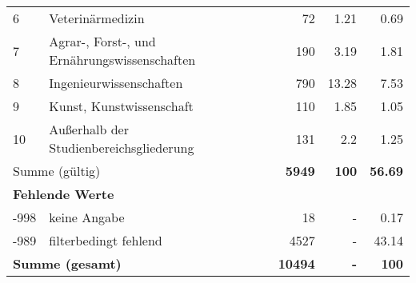 \begin{longtable}{lXrrr}
     6 &
     \multicolumn{1}{X}{ Veterinärmedizin   } &


       \num{72} &
       \num[round-mode=places,round-precision=2]{1,21} &
         \num[round-mode=places,round-precision=2]{0,69} \\

     7 &
     \multicolumn{1}{X}{ Agrar-, Forst-, und Ernährungswissenschaften   } &


       \num{190} &
       \num[round-mode=places,round-precision=2]{3,19} &
         \num[round-mode=places,round-precision=2]{1,81} \\

     8 &
     \multicolumn{1}{X}{ Ingenieurwissenschaften   } &


       \num{790} &
       \num[round-mode=places,round-precision=2]{13,28} &
         \num[round-mode=places,round-precision=2]{7,53} \\

     9 &
     \multicolumn{1}{X}{ Kunst, Kunstwissenschaft   } &


       \num{110} &
       \num[round-mode=places,round-precision=2]{1,85} &
         \num[round-mode=places,round-precision=2]{1,05} \\

     10 &
     \multicolumn{1}{X}{ Außerhalb der Studienbereichsgliederung   } &


       \num{131} &
       \num[round-mode=places,round-precision=2]{2,2} &
         \num[round-mode=places,round-precision=2]{1,25} \\
     \midrule
     \multicolumn{2}{l}{Summe (gültig)} &
       \textbf{\num{5949}} &
     \textbf{100} &
       \textbf{\num[round-mode=places,round-precision=2]{56,69}} \\
     \multicolumn{5}{l}{\textbf{Fehlende Werte}}\\
       -998 &
       keine Angabe &
         \num{18} &
        - &
         \num[round-mode=places,round-precision=2]{0,17} \\
       -989 &
       filterbedingt fehlend &
         \num{4527} &
        - &
         \num[round-mode=places,round-precision=2]{43,14} \\
     \midrule
     \multicolumn{2}{l}{\textbf{Summe (gesamt)}} &
          \textbf{\num{10494}} &
        \textbf{-} &
        \textbf{100} \\
     \bottomrule
     \end{longtable}
     
